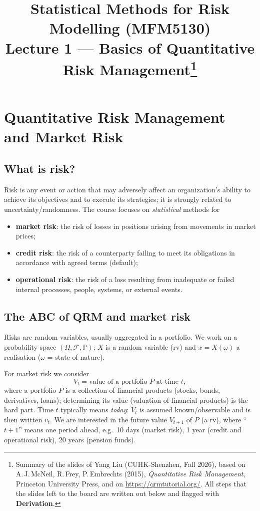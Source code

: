 \documentclass[11pt,a4paper]{article}
\title{\bfseries Statistical Methods for Risk Modelling (MFM5130)\\[2mm]
\large Lecture 1 --- Basics of Quantitative Risk Management\thanks{Summary of the slides of Yang Liu (CUHK-Shenzhen, Fall 2026), based on
A.\,J.\,McNeil, R.\,Frey, P.\,Embrechts (2015), \emph{Quantitative Risk Management}, Princeton University Press,
and on \url{https://qrmtutorial.org/}. All steps that the slides left to the board are written out below and
flagged with \textbf{Derivation}.}}
\author{}
\date{}
\renewcommand{\P}{\mathbb{P}}
\begin{document}
\maketitle

\tableofcontents

\section{Quantitative Risk Management and Market Risk}

\subsection{What is risk?}
Risk is any event or action that may adversely affect an organization's ability to achieve its
objectives and to execute its strategies; it is strongly related to uncertainty/randomness. The
course focuses on \emph{statistical} methods for
\begin{itemize}[nosep]
  \item \textbf{market risk}: the risk of losses in positions arising from movements in market prices;
  \item \textbf{credit risk}: the risk of a counterparty failing to meet its obligations in accordance
        with agreed terms (default);
  \item \textbf{operational risk}: the risk of a loss resulting from inadequate or failed internal
        processes, people, systems, or external events.
\end{itemize}

\subsection{The ABC of QRM and market risk}
Risks are random variables, usually aggregated in a portfolio. We work on a probability space
$(\Omega,\mathcal{F},\P)$; $X$ is a random variable (rv) and $x=X(\omega)$ a realisation
($\omega$ = state of nature).

For market risk we consider
\[
V_t=\text{value of a portfolio }P\text{ at time }t,
\]
where a portfolio $P$ is a collection of financial products (stocks, bonds, derivatives, loans);
determining its value (valuation of financial products) is the hard part. Time $t$ typically means
\emph{today}: $V_t$ is assumed known/observable and is then written $v_t$. We are interested in the
future value $V_{t+1}$ of $P$ (a rv), where ``$t+1$'' means one period ahead, e.g.\ 10 days (market
risk), 1 year (credit and operational risk), 20 years (pension funds).
\end{document}
